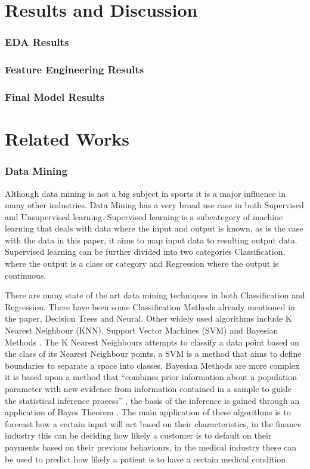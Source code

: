 \documentclass{imc-inf}
\begin{document}
	\chapter{Results and Discussion}\label{chap:Results}
	
	\subsection{EDA Results}
	
	\subsection{Feature Engineering Results}
	
	\subsection{Final Model Results}
	
	\chapter{Related Works}\label{chap:related_works}
	\subsection{Data Mining}
	Although data mining is not a big subject in sports it is a major influence in many other industries. Data Mining has a very broad use case in both Supervised and Unsupervised learning. Supervised learning is a subcategory of machine learning that deals with data where the input and output is known, as is the case with the data in this paper, it aims to map input data to resulting output data. Supervised learning can be further divided into two categories Classification, where the output is a class or category and Regression where the output is continuous. 
	
	There are many state of the art data mining techniques in both Classification and Regression. There have been some Classification Methods already mentioned in the paper, Decision Trees and Neural. Other widely used algorithms include K Nearest Neighbour (KNN), Support Vector Machines (SVM) and Bayesian Methods \cite{SOTA}. The K Nearest Neighbours attempts to classify a data point based on the class of its Nearest Neighbour points, a SVM is a method that aims to define boundaries to separate a space into classes. Bayesian Methods are more complex it is based upon a method that “combines prior information about a population parameter with new evidence from information contained in a sample to guide the statistical inference process” \cite{website:Britannica}, the basis of the inference is gained through an application of Bayes Theorem \cite{website:Britannica}. The main application of these algorithms is to forecast how a certain input will act based on their characteristics, in the finance industry this can be deciding how likely a customer is to default on their payments based on their previous behaviours, in the medical industry these can be used to predict how likely a patient is to have a certain medical condition.
	
\end{document}
